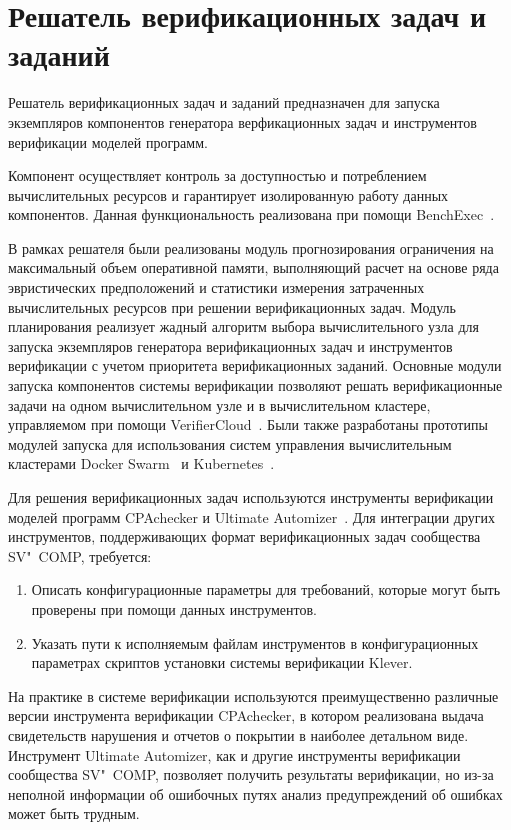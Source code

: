 \section{Решатель верификационных задач и заданий}
Решатель верификационных задач и заданий предназначен для запуска экземпляров компонентов генератора верфикационных задач и инструментов верификации моделей программ.

Компонент осуществляет контроль за доступностью и потреблением вычислительных ресурсов и гарантирует изолированную работу данных компонентов.
Данная функциональность реализована при помощи BenchExec~\cite{Beyer2015}.

В рамках решателя были реализованы модуль прогнозирования ограничения на максимальный объем оперативной памяти, выполняющий расчет на основе ряда эвристических предположений и статистики измерения затраченных вычислительных ресурсов при решении верификационных задач.
Модуль планирования реализует жадный алгоритм выбора вычислительного узла для запуска экземпляров генератора верификационных задач и инструментов верификации с учетом приоритета верификационных заданий.
Основные модули запуска компонентов системы верификации позволяют решать верификационные задачи на одном вычислительном узле и в вычислительном кластере, управляемом при помощи VerifierCloud~\cite{VerifierCloud}.
Были также разработаны прототипы модулей запуска для использования систем управления вычислительным кластерами Docker Swarm~\cite{swarm} и Kubernetes~\cite{kubernetes}.

Для решения верификационных задач используются инструменты верификации моделей программ CPAchecker и Ultimate Automizer~\cite{Heizmann2015}.
Для интеграции других инструментов, поддерживающих формат верификационных задач сообщества SV"~COMP, требуется:
\begin{enumerate}
\item Описать конфигурационные параметры для требований, которые могут быть проверены при помощи данных инструментов.
\item Указать пути к исполняемым файлам инструментов в конфигурационных параметрах скриптов установки системы верификации Klever.
\end{enumerate}

На практике в системе верификации используются преимущественно различные версии инструмента верификации CPAchecker, в котором реализована выдача свидетельств нарушения и отчетов о покрытии в наиболее детальном виде.
Инструмент Ultimate Automizer, как и другие инструменты верификации сообщества SV"~COMP, позволяет получить результаты верификации, но из-за неполной информации об ошибочных путях анализ предупреждений об ошибках может быть трудным.

